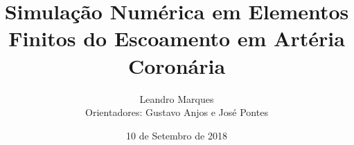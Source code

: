 

\usepackage[T1]{fontenc} %
\usepackage[utf8]{inputenc} %
\usepackage[portuguese]{babel} %
\usepackage{cite} %
\usepackage{epsf,epsfig,psfig} %
\usepackage{fancyhdr} %
\usepackage{setspace} %
\usepackage{float} %
\usepackage{makeidx} %
\usepackage{amsmath,amssymb,bm,amsbsy} %
\usepackage{mathtools} %
\usepackage{lipsum} %
\usepackage{tikz}
\usetikzlibrary{patterns}
\usepackage{relsize}
\usetikzlibrary{shapes,arrows,arrows.meta,matrix}


\title[]{Simulação Numérica em Elementos Finitos do Escoamento em Artéria Coronária}
\subtitle{}
\author{\vspace{0.5cm} Leandro Marques\\
        Orientadores: Gustavo Anjos e José Pontes}

\date{10 de Setembro de 2018}


\beamertemplatenavigationsymbolsempty 


